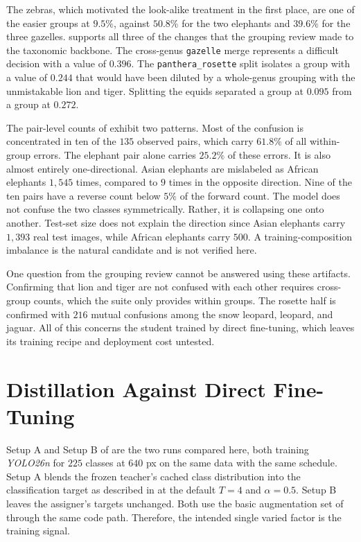 The zebras, which motivated the look-alike treatment in the first place, are one of the easier groups at $9.5\%$, against $50.8\%$ for the two elephants and $39.6\%$ for the three gazelles.  supports all three of the changes that the  grouping review made to the taxonomic backbone. The cross-genus \texttt{gazelle} merge represents a difficult decision with a value of $0.396$. The \texttt{panthera\_rosette} split isolates a group with a value of $0.244$ that would have been diluted by a whole-genus grouping with the unmistakable lion and tiger. Splitting the equids separated a group at $0.095$ from a group at $0.272$.

The pair-level counts of  exhibit two patterns. Most of the confusion is concentrated in ten of the $135$ observed pairs, which carry $61.8\%$ of all within-group errors. The elephant pair alone carries $25.2\%$ of these errors. It is also almost entirely one-directional. Asian elephants are mislabeled as African elephants $1{,}545$ times, compared to $9$ times in the opposite direction. Nine of the ten pairs have a reverse count below $5\%$ of the forward count. The model does not confuse the two classes symmetrically. Rather, it is collapsing one onto another. Test-set size does not explain the direction since Asian elephants carry $1{,}393$ real test images, while African elephants carry $500$.  %
A training-composition imbalance is the natural candidate and is not verified here.

One question from the grouping review cannot be answered using these artifacts. Confirming that lion and tiger are not confused with each other requires cross-group counts, which the suite only provides within groups. The rosette half is confirmed with $216$ mutual confusions among the snow leopard, leopard, and jaguar. All of this concerns the student trained by direct fine-tuning, which leaves its training recipe and deployment cost untested.

\section{Distillation Against Direct Fine-Tuning}\label{sec:results_kd_basic_comparison}

Setup A and Setup B of  are the two runs compared here, both training \textit{YOLO26n} for $225$ classes at $640$ px on the same data with the same schedule.
Setup A blends the frozen teacher's cached class distribution into the classification target as described in  at the default $T = 4$ and $\alpha = 0.5$. Setup B leaves the assigner's targets unchanged. Both use the basic augmentation set of  through the same code path. Therefore, the intended single varied factor is the training signal.

